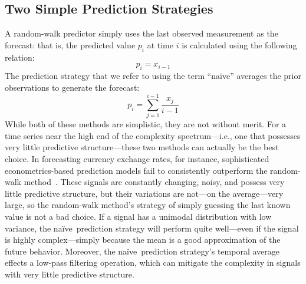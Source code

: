 \documentclass[%
pre,
reprint,
superscriptaddress,
showpacs,
nofootinbib,
nobibnotes,
 amsmath,amssymb,
 aps,
]{revtex4-1}
\newcommand{\naive}{na\"ive}
\newcommand{\alert}[1]{{\color{red}#1}}
\begin{document}

\subsection{Two Simple Prediction Strategies}
\label{sec:simple}

A random-walk predictor simply uses the last observed measurement as
the forecast: that is, the predicted value $p_i$ at time $i$ is
calculated using the following relation: $$p_i = x_{i-1}$$ The
prediction strategy that we refer to using the term ``\naive''
averages the prior observations to generate the forecast: $$p_i =
\sum_{j=1}^{i-1}\frac{x_j}{i-1}$$ While both of these methods are
simplistic, they are not without merit.  For a time series near the
high end of the complexity spectrum---i.e., one that possesses very
little predictive structure---these two methods can actually be the
best choice.  In forecasting currency exchange rates, for instance,
sophisticated econometrics-based prediction models fail to
consistently outperform the random-walk method~\cite{rwMeese,rwCCE}.
These signals are constantly changing, noisy, and possess very little
predictive structure, but their variations are not---on the
average---very large, so the random-walk method's strategy of simply
guessing the last known value is not a bad choice.  If a signal has a
unimodal distribution with low variance, the \naive ~prediction
strategy will perform quite well---even if the signal is highly
complex---simply because the mean is a good approximation of the
future behavior.  Moreover, the \naive ~prediction strategy's temporal
average effects a low-pass filtering operation, which can  mitigate the
complexity in signals with very little predictive structure.
\end{document}
